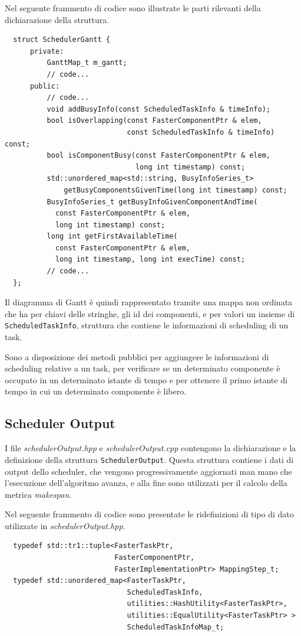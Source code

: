 Nel seguente frammento di codice sono illustrate le parti rilevanti della 
dichiarazione della struttura.
\newline
\begin{verbatim}
  struct SchedulerGantt {
      private:
          GanttMap_t m_gantt;
          // code...
      public:
          // code...
          void addBusyInfo(const ScheduledTaskInfo & timeInfo);
          bool isOverlapping(const FasterComponentPtr & elem,
                             const ScheduledTaskInfo & timeInfo) const;
          bool isComponentBusy(const FasterComponentPtr & elem,
                               long int timestamp) const;
          std::unordered_map<std::string, BusyInfoSeries_t> 
              getBusyComponentsGivenTime(long int timestamp) const;
          BusyInfoSeries_t getBusyInfoGivenComponentAndTime(
            const FasterComponentPtr & elem,
            long int timestamp) const;
          long int getFirstAvailableTime(
            const FasterComponentPtr & elem, 
            long int timestamp, long int execTime) const;
          // code...
  };
\end{verbatim}
Il diagramma di Gantt è quindi rappresentato tramite una mappa non ordinata 
che ha per chiavi delle stringhe, gli id dei componenti, e per valori un 
insieme di \verb+ScheduledTaskInfo+, struttura che contiene le informazioni di 
scheduling di un task.

Sono a disposizione dei metodi pubblici per aggiungere le informazioni di 
scheduling relative a un task, per verificare se un determinato componente è 
occupato in un determinato istante di tempo e per ottenere il primo istante di 
tempo in cui un determinato componente è libero.

\subsection{Scheduler Output}
I file \emph{schedulerOutput.hpp} e \emph{schedulerOutput.cpp} contengono la 
dichiarazione e la definizione della struttura \verb+SchedulerOutput+. Questa 
struttura contiene i dati di output dello scheduler, che vengono 
progressivamente aggiornati man mano che l'esecuzione dell'algoritmo avanza, e 
alla fine sono utilizzati per il calcolo della metrica \emph{makespan}.


Nel seguente frammento di codice sono presentate le ridefinizioni di tipo di 
dato utilizzate in \emph{schedulerOutput.hpp}.
\newline
\begin{verbatim}
  typedef std::tr1::tuple<FasterTaskPtr,
                          FasterComponentPtr, 
                          FasterImplementationPtr> MappingStep_t;
  typedef std::unordered_map<FasterTaskPtr,
                             ScheduledTaskInfo, 
                             utilities::HashUtility<FasterTaskPtr>, 
                             utilities::EqualUtility<FasterTaskPtr> > 
                             ScheduledTaskInfoMap_t;
\end{verbatim}

